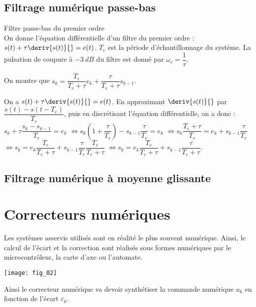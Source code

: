 \subsection{Filtrage numérique passe-bas}
\begin{defi}{Filtre passe-bas du premier ordre}~\\
On donne l'équation différentielle d'un filtre du premier ordre : $s(t)+\tau \deriv{s(t)}{} = e(t)$.  $T_e$ est la période d'échantillonnage du système. La pulsation de coupure à $-\SI{3}{dB}$ du filtre est donné par $\omega_c = \dfrac{1}{\tau}$.

On montre que $s_k = \dfrac{T_e}{T_e+\tau} e_k + \dfrac{\tau}{T_e+\tau} s_{k-1}$. 
\end{defi}

\begin{demo}
On a  $s(t)+\tau \deriv{s(t)}{} = e(t)$. En approximant $\deriv{s(t)}{}$ par $\dfrac{s(t) -s(t-T_e)}{T_e}$, puis en discrétisant l'équation différentielle, on a donc : 
 $s_k +\tau \dfrac{s_k - s_{k-1}}{T_e} = e_k$
 $\Leftrightarrow s_k \left(1+\dfrac{\tau}{T_e}\right) - s_{k-1}\dfrac{\tau}{T_e} = e_k$
 $\Leftrightarrow s_k \dfrac{T_e+\tau}{T_e}  = e_k + s_{k-1}\dfrac{\tau}{T_e}$
  $\Leftrightarrow s_k   = e_k \dfrac{T_e}{T_e+\tau}+ s_{k-1}\dfrac{\tau}{T_e}\dfrac{T_e}{T_e+\tau}$
   $\Leftrightarrow s_k   = e_k \dfrac{T_e}{T_e+\tau}+ s_{k-1}\dfrac{\tau}{T_e+\tau}$.
\end{demo}

\subsection{Filtrage numérique à moyenne glissante} 

\section{Correcteurs numériques}
 
 Les systèmes asservis utilisés sont en réalité le plus souvent numérique. Ainsi, le calcul de l'écart et la correction sont 
 réalisés sous formes numériques par le microcontrôleur, la carte d'axe ou l'automate. 
 
 \begin{center}
\texttt{[image: fig\_02]}
\end{center}

Ainsi le correcteur numérique va devoir synthétiser la commande numérique $u_k$ en fonction de l'écart $\varepsilon_k$. 


